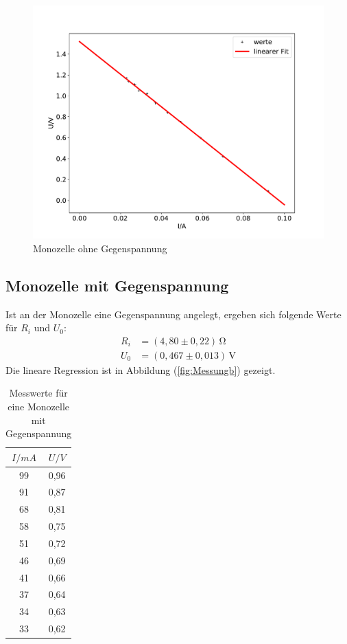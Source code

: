 \begin{figure}[H]
  \centering
  \includegraphics[width=\textwidth]{plota.pdf}
  \caption{Monozelle ohne Gegenspannung}
  \label{fig:Messunga}
\end{figure}
\subsection{Monozelle mit Gegenspannung}
Ist an der Monozelle eine Gegenspannung angelegt,
ergeben sich folgende Werte für $R_i$ und $U_0$:
\begin{align*}
  R_i &= (4,80 \pm 0,22)\, \mathrm{\Omega}\\
  U_0 &= (0,467 \pm 0,013)\, \mathrm{V}
\end{align*}
Die lineare Regression ist in Abbildung (\ref{fig:Messungb}) gezeigt.
\begin{table}
  \centering
  \caption{Messwerte für eine Monozelle mit Gegenspannung}
  \label{tab:2}
  \begin{tabular}{c c}
    \toprule $I/mA$ & $U/V$ \\
    \midrule
    99 & 0,96\\
    91 & 0,87\\
    68 & 0,81\\
    58 & 0,75\\
    51 & 0,72\\
    46 & 0,69\\
    41 & 0,66\\
    37 & 0,64\\
    34 & 0,63\\
    33 & 0,62\\
    \bottomrule
  \end{tabular}
\end{table}

